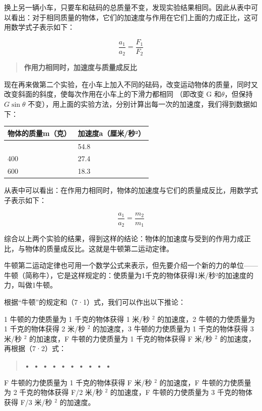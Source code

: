 换上另一辆小车，只要车和砝码的总质量不变，发现实验结果相同。因此从表中可以看出：对于相同质量的物体，它们的加速度与作用在它们上面的力成正比，这可用数学式子表示如下：

\[
\frac {a _ {1}}{a _ {2}} = \frac {F _ {1}}{F _ {2}} \tag {7.1}
\]

\begin{quote}
\textbf{作用力相同时，加速度与质量成反比}
\end{quote}

现在再来做第二个实验，在小车上加入不同的砝码，改变运动物体的质量，同时又改变斜面的斜度，使每次作用在小车上的下滑力都相同
（即改变 G 和\(\theta\)，但保持 \(G\sin \theta\)
不变），用上面的实验方法，分别计算出每一次的加速度，我们得到数据如下：

{\def\LTcaptype{none} %
\begin{longtable}[]{@{}ll@{}}
\toprule\noalign{}
物体的质量m（克） & 加速度a（厘米/秒²） \\
\midrule\noalign{}
\endhead
\bottomrule\noalign{}
\endlastfoot
200 & 54.8 \\
400 & 27.4 \\
600 & 18.3 \\
\end{longtable}
}

从表中可以看出：在作用力相同时，物体的加速度与它们的质量成反比，用数学式子表示如下：

\[
\frac {a _ {1}}{a _ {2}} = \frac {m _ {2}}{m _ {1}} \tag {7.2}
\]

综合以上两个实验的结果，得到这样的结论：物体的加速度与受到的作用力成正比，与物体的质量成反比。这就是牛顿第二运动定律。

牛顿第二运动定律也可用一个数学公式来表示，但先要介绍一个新的力的单位------牛顿（简称牛），它是这样规定的：使质量为1千克的物体获得1米/秒²的加速度的力，叫做1牛顿。

根据``牛顿''的规定和（7·1）式，我们可以作出以下推论：

1 牛顿的力使质量为 1 千克的物体获得 1 米/秒 \(^{2}\) 的加速度，2
牛顿的力使质量为 1 千克的物体获得 2 米/秒 \(^{2}\) 的加速度，3
牛顿的力使质量为 1 千克的物体获得 3 米/秒 \(^{2}\) 的加速度，F
牛顿的力使质量为 1 千克的物体获得 F 米/秒 \(^{2}\)
的加速度，再根据（7·2）式：

\begin{quote}
\textbf{• • • • • • • • • •}
\end{quote}

F 牛顿的力使质量为 1 千克的物体获得 F 米/秒 \(^{2}\) 的加速度，F
牛顿的力使质量为 2 千克的物体获得 F/2 米/秒 \(^{2}\) 的加速度，F
牛顿的力使质量为 3 千克的物体获得 F/3 米/秒 \(^{2}\) 的加速度。

